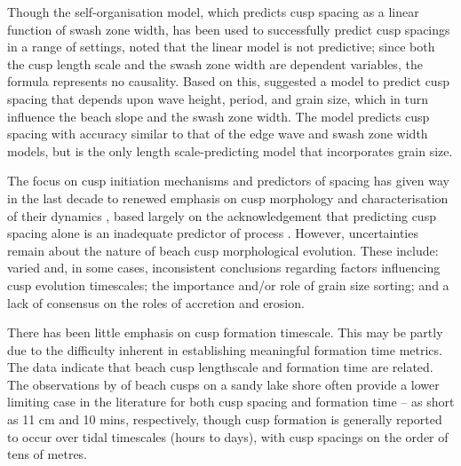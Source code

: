 Though the self-organisation model, which predicts cusp spacing as a linear function of swash zone width, has been used to successfully predict cusp spacings in a range of settings, \citet{Sunamura2004} noted that the linear model is not predictive; since both the cusp length scale and the swash zone width are dependent variables, the formula represents no causality. Based on this, \citeauthor{Sunamura2004} suggested a model to predict cusp spacing that depends upon wave height, period, and grain size, which in turn influence the beach slope and the swash zone width. The model predicts cusp spacing with accuracy similar to that of the edge wave and swash zone width models, but is the only length scale-predicting model that incorporates grain size.  

The focus on cusp initiation mechanisms and predictors of spacing has given way in the last decade to renewed emphasis on cusp morphology and characterisation of their dynamics \citep[][]{Almar_etal2008, VanGaalen_etal2011, Vousdoukas2012, Poate_etal2014}, based largely on the acknowledgement that predicting cusp spacing alone is an inadequate predictor of process \citep[e.g.,][]{Coco_etal1999, Almar_etal2008}. However, uncertainties remain about the nature of beach cusp morphological evolution. These include: varied and, in some cases, inconsistent conclusions regarding factors influencing cusp evolution timescales; the importance and/or role of grain size sorting; and a lack of consensus on the roles of accretion and erosion. 

There has been little emphasis on cusp formation timescale. This may be partly due to the difficulty inherent in establishing meaningful formation time metrics. The data indicate that beach cusp lengthscale and formation time are related. The observations by \citet{Komar1973} of beach cusps on a sandy lake shore often provide a lower limiting case in the literature for both cusp spacing and formation time -- as short as 11 cm and 10 mins, respectively, though cusp formation is generally reported to occur over tidal timescales (hours to days), with cusp spacings on the order of tens of metres. 

